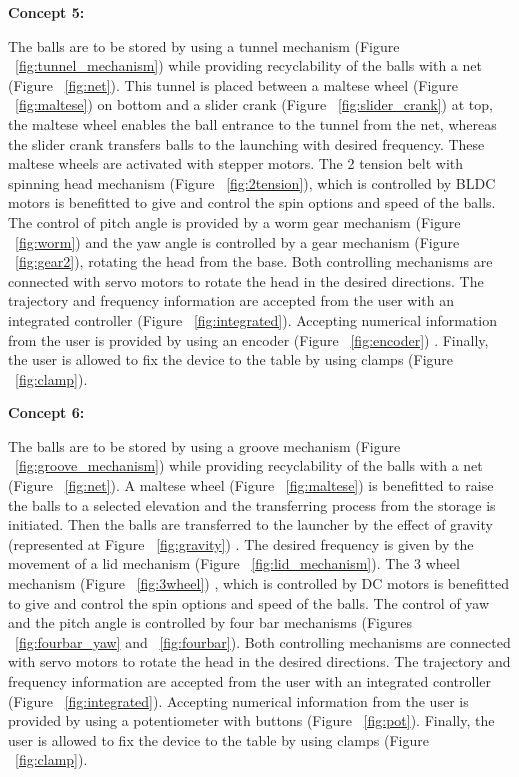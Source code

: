\documentclass[12pt]{article}
\begin{document}
    \textbf{Concept 5:}

    The balls are to be stored by using a tunnel mechanism (Figure ~\ref{fig:tunnel_mechanism}) while providing recyclability of the balls with a net (Figure ~\ref{fig:net}). This tunnel is placed between a maltese wheel (Figure ~\ref{fig:maltese}) on bottom and a slider crank (Figure ~\ref{fig:slider_crank}) at top, the maltese wheel enables the ball entrance to the tunnel from the net, whereas the slider crank transfers balls to the launching with desired frequency. These maltese wheels are activated with stepper motors. The 2 tension belt with spinning head mechanism (Figure ~\ref{fig:2tension}), which is controlled by BLDC motors is benefitted to give and control the spin options and speed of the balls. The control of pitch angle is provided by a worm gear mechanism (Figure ~\ref{fig:worm}) and the yaw angle is controlled by a gear mechanism (Figure ~\ref{fig:gear2}), rotating the head from the base. Both controlling mechanisms are connected with servo motors to rotate the head in the desired directions. The trajectory and frequency information are accepted from the user with an integrated controller (Figure ~\ref{fig:integrated}). Accepting numerical information from the user is provided by using an encoder (Figure ~\ref{fig:encoder}) . Finally, the user is allowed to fix the device to the table by using clamps (Figure ~\ref{fig:clamp}).

    \textbf{Concept 6:}

    The balls are to be stored by using a groove mechanism (Figure ~\ref{fig:groove_mechanism}) while providing recyclability of the balls with a net (Figure ~\ref{fig:net}). A maltese wheel (Figure ~\ref{fig:maltese}) is benefitted to raise the balls to a selected elevation and the transferring process from the storage is initiated. Then the balls are transferred to the launcher by the effect of gravity (represented at Figure ~\ref{fig:gravity}) . The desired frequency is given by the movement of a lid mechanism (Figure ~\ref{fig:lid_mechanism}). The 3 wheel mechanism (Figure ~\ref{fig:3wheel}) , which is controlled by DC motors is benefitted to give and control the spin options and speed of the balls. The control of yaw and the pitch angle is controlled by four bar mechanisms (Figures ~\ref{fig:fourbar_yaw} and ~\ref{fig:fourbar}). Both controlling mechanisms are connected with servo motors to rotate the head in the desired directions. The trajectory and frequency information are accepted from the user with an integrated controller (Figure ~\ref{fig:integrated}). Accepting numerical information from the user is provided by using a potentiometer with buttons (Figure ~\ref{fig:pot}). Finally, the user is allowed to fix the device to the table by using clamps (Figure ~\ref{fig:clamp}).
\end{document}
